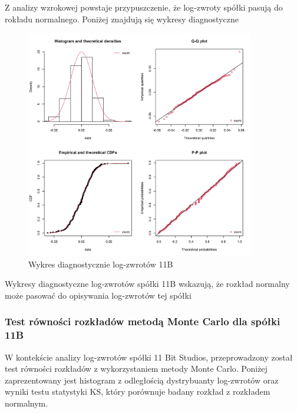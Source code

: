 \documentclass[a4paper,11pt]{article}
\begin{document}
Z analizy wzrokowej powstaje przypuszczenie, że log-zwroty spółki pasują do rokładu normalnego. Poniżej znajdują się wykresy diagnostyczne

\begin{figure}[h]
\centering
\includegraphics[width=10cm, height=10cm]{img/diff_11b_wykresy_diagnostyczne.png}
\caption{Wykres diagnostycznie log-zwrotów 11B}
\end{figure}

Wykresy diagnostyczne log-zwrotów spółki 11B wskazują, że rozkład normalny może pasować do opisywania log-zwrotów tej spółki

\newpage
\subsubsection{Test równości rozkładów metodą Monte Carlo dla spółki 11B}
W kontekście analizy log-zwrotów spółki 11 Bit Studios, przeprowadzony został test równości rozkładów z wykorzystaniem metody Monte Carlo. Poniżej zaprezentowany jest histogram z odległością dystrybuanty log-zwrotów oraz wyniki testu statystyki KS, który porównuje badany rozkład z rozkładem normalnym.
\end{document}
